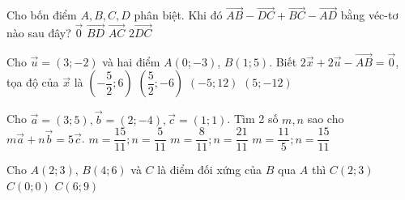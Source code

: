\begin{ex}%
	Cho bốn điểm $A, B, C, D$ phân biệt. Khi đó $\vec{AB} - \vec{DC} + \vec{BC} - \vec{AD}$ bằng véc-tơ nào sau đây?
	\choice
	{\True $\vec{0}$}
	{$\vec{BD}$}
	{$\vec{AC}$}
	{$2\vec{DC}$}
\end{ex}

\begin{ex}%
	Cho $\vec{u} = (3; -2)$ và hai điểm $A(0; -3)$, $B(1; 5)$. Biết $2\vec{x} + 2\vec{u} - \vec{AB} = \vec{0}$, tọa độ của $\vec{x}$ là
	\choice
	{\True $\left(-\dfrac{5}{2}; 6\right)$}
	{$\left(\dfrac{5}{2}; -6\right)$}
	{$\left(-5; 12\right)$}
	{$\left(5; -12\right)$}
\end{ex}

\begin{ex}%
	Cho $\vec{a} = (3; 5), \vec{b} = (2; -4), \vec{c} = (1; 1)$. Tìm 2 số $m, n$ sao cho $m\vec{a} + n\vec{b} = 5\vec{c}$.
	{\True $m = \dfrac{15}{11}; n = \dfrac{5}{11}$}
	{$m = \dfrac{8}{11}; n = \dfrac{21}{11} $}
	{$m = \dfrac{11}{5}; n = \dfrac{15}{11} $}
\end{ex}

\begin{ex}%
	[0H1K4-3]
	Cho $A(2; 3)$, $B(4; 6)$ và $C$ là điểm đối xứng của $B$ qua $A$ thì
	{$C(2; 3)$}
	{\True $C(0; 0)$}
	{$C(6; 9)$}
\end{ex}


